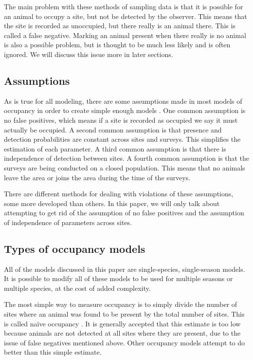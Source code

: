 \documentclass[12pt]{article}
\begin{document}
    The main problem with these methods of sampling data is that it is possible
    for an animal to occupy a site, but not be detected by the observer. This
    means that the site is recorded as unoccupied, but there really is an animal
    there. This is called a false negative. Marking an animal present when there
    really is no animal is also a possible problem, but is thought to be much
    less likely and is often ignored. We will discuss this issue more in later sections.

    \subsection{Assumptions}
    As is true for all modeling, there are some assumptions made in most models of occupancy 
in order to create simple enough models \cite{MacKenzie2006}. One common assumption is no false positives, which means if a
    site is recorded as occupied we say it must actually be occupied. A second
    common assumption is that presence and detection probabilities are constant
    across sites and surveys. This simplifies the estimation of each parameter.
    A third common assumption is that there is independence of detection between
    sites. A fourth common assumption is that the surveys are being conducted on
    a closed population. This means that no animals leave the area or joins the
    area during the time of the surveys.

    There are different methods for dealing with violations of these assumptions, some 
more developed than others.  In this paper, we will only talk about attempting to get rid of the
    assumption of no false positives and the assumption of independence of
    parameters across sites.

    \subsection{Types of occupancy models}
    All of the models discussed in this paper are single-species, single-season
    models. It is possible to modify all of these models to be used for multiple
    seasons or multiple species, at the cost of added complexity.

    The most simple way to measure occupancy is to simply divide the number of
    sites where an animal was found to be present by the total number of sites.
    This is called na\"ive occupancy \cite{MacKenzie2006}. It is generally
    accepted that this estimate is too low because animals are not detected at
    all sites where they are present, due to the issue of false negatives
    mentioned above. Other occupancy models attempt to do better than this
    simple estimate.
\end{document}
